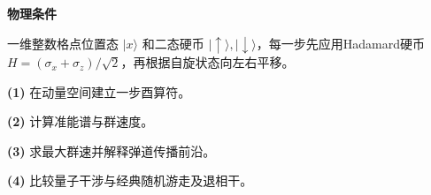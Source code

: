 \textbf{物理条件}\par 一维整数格点位置态 \(|x\rangle\) 和二态硬币 \(|\uparrow\rangle,|\downarrow\rangle\)，每一步先应用Hadamard硬币 \(H=(\sigma_x+\sigma_z)/\sqrt2\)，再根据自旋状态向左右平移。
\par\noindent\textbf{(1)} 在动量空间建立一步酉算符。
\par\noindent\textbf{(2)} 计算准能谱与群速度。
\par\noindent\textbf{(3)} 求最大群速并解释弹道传播前沿。
\par\noindent\textbf{(4)} 比较量子干涉与经典随机游走及退相干。
